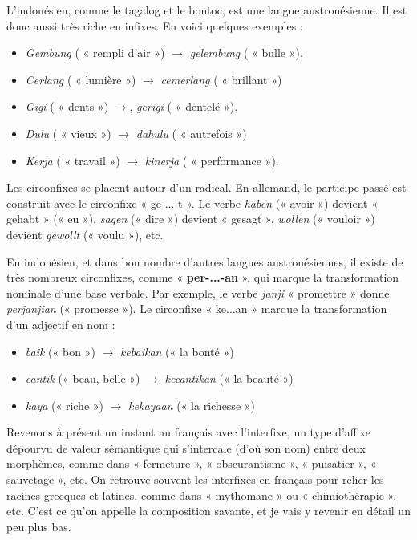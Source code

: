 L’indonésien, comme le tagalog et le bontoc, est une langue austronésienne. Il est donc aussi très riche en infixes. En voici quelques exemples :
\begin{itemize}
\item \textit{Gembung} ( « rempli d’air ») $\rightarrow$ \textit{gelembung} ( « bulle »).
\item \textit{Cerlang} ( « lumière ») $\rightarrow$ \textit{cemerlang} ( « brillant »)
\item \textit{Gigi} ( « dents ») $\rightarrow$, \textit{gerigi} ( « dentelé »).
\item \textit{Dulu} ( « vieux ») $\rightarrow$ \textit{dahulu} ( « autrefois »)
\item \textit{Kerja} ( « travail ») $\rightarrow$ \textit{kinerja} ( « performance »).
\end{itemize}

Les circonfixes se placent autour d’un radical. En allemand, le participe passé est construit avec le circonfixe « ge-...-t ». Le verbe \textit{haben} (« avoir ») devient « gehabt » (« eu »), \textit{sagen} (« dire ») devient « gesagt », \textit{wollen} (« vouloir ») devient \textit{gewollt} (« voulu »), etc.

En indonésien, et dans bon nombre d’autres langues austronésiennes, il existe de très nombreux circonfixes, comme « \textbf{per-...-an} », qui marque la transformation nominale d’une base verbale. Par
exemple, le verbe \textit{janji} « promettre » donne \textit{perjanjian} (« promesse »). Le circonfixe « ke...an » marque la transformation d’un adjectif en nom :
\begin{itemize}
\item \textit{baik} (« bon ») $\rightarrow$ \textit{kebaikan} (« la bonté »)
\item \textit{cantik} (« beau, belle ») $\rightarrow$ \textit{kecantikan} (« la beauté »)
\item \textit{kaya} (« riche ») $\rightarrow$ \textit{kekayaan} (« la richesse »)
\end{itemize}

Revenons à présent un instant au français avec l’interfixe, un type d’affixe dépourvu de valeur sémantique qui s’intercale (d’où son nom) entre deux morphèmes, comme dans « fermeture », « obscurantisme », « puisatier », « sauvetage », etc. On retrouve souvent les interfixes en français pour relier les racines grecques et latines, comme dans « mythomane » ou « chimiothérapie », etc. C’est ce qu’on appelle la composition savante, et je vais y revenir en détail un peu plus bas.

